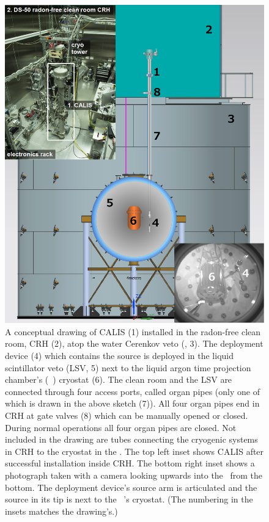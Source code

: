 \begin{figure}[htbp]
 \centering
\includegraphics[width=\textwidth]{Figures/DS50_with_CALIS_twoinsets}
\caption{A conceptual drawing of CALIS (1) installed in the radon-free clean room, CRH (2), atop the water Cerenkov veto (\wcv, 3). The deployment device (4) which contains the source is deployed in the liquid scintillator veto (LSV, 5) next to the liquid argon time projection chamber's (\lar\ \tpc) cryostat (6). The clean room and the LSV are connected through four access ports, called organ pipes (only one of which is drawn in the above sketch (7)). All four organ pipes end in CRH at gate valves (8) which can be manually opened or closed. During normal operations all four organ pipes are closed. Not included in the drawing are tubes connecting the cryogenic systems in CRH to the cryostat in the \lsv. The top left inset shows CALIS after successful installation inside CRH. The bottom right inset shows a photograph taken with a camera looking upwards into the \lsv\ from the bottom. The deployment device's source arm is articulated and the source in its tip is next to the \lar\ \tpc's cryostat. (The numbering in the insets matches the drawing's.) \label{fig:wholeAssembly_insideDetectors}\label{fig:DS50_with_CALIS}}
\end{figure}